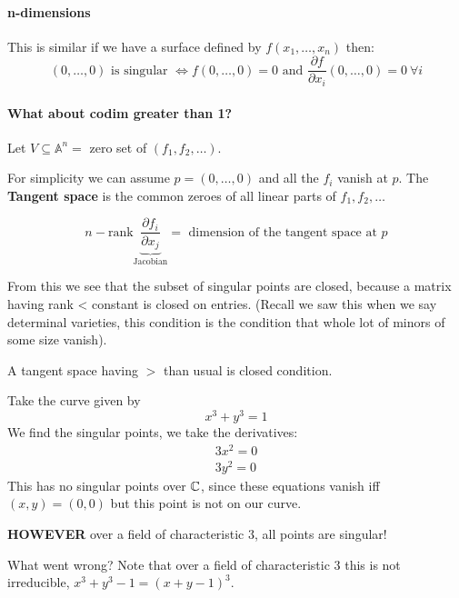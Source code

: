 \paragraph*{n-dimensions}
This is similar if we have a surface defined by $f(x_1,\ldots,x_n)$ then:
\[(0,\ldots,0) \text{ is singular } \iff f(0,\ldots,0) = 0 \text{ and }\frac{\partial f}{\partial x_i}(0,\ldots,0) = 0 \ \forall i\]


\paragraph*{What about codim greater than 1?}
\begin{definition}
    Let $V\subseteq \mathbb{A}^n =$ zero set of $(f_1,f_2,\ldots)$.

    For simplicity we can assume $p = (0,\ldots,0)$ and all the $f_i$ vanish at $p$. The \textbf{Tangent space} is the common zeroes of all linear parts of $f_1,f_2,\ldots$ 

    \[n - \text{rank}\underbrace{\frac{\partial f_i}{\partial x_j}}_{\text{Jacobian}} = \text{ dimension of the tangent space at }p\]
    
    From this we see that the subset of singular points are closed, because a matrix having rank < constant is closed on entries. (Recall we saw this when we say determinal varieties, this condition is the condition that whole lot of minors of some size vanish).

    A tangent space having $>$ than usual is closed condition.
\end{definition}

\begin{example}
    Take the curve given by \[x^3+y^3 = 1\]
    We find the singular points, we take the derivatives:\[\begin{array}{c}
        3x^2 = 0\\
        3y^2 = 0
    \end{array}\]
    This has no singular points over $\mathbb{C}$, since these equations vanish iff $(x,y) = (0,0)$ but this point is not on our curve.

    \textbf{HOWEVER} over a field of characteristic $3$, all points are singular!

    What went wrong?
    Note that over a field of characteristic $3$ this is not irreducible, $x^3+y^3 - 1 = {(x+y - 1)}^3$.

\end{example}


